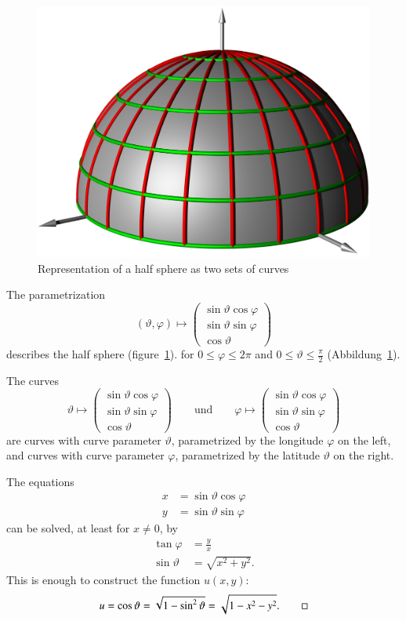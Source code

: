 \begin{beispiel}
\begin{figure}
\centering
\includegraphics[width=0.8\hsize]{../common/3d/kugel.jpg}
\caption{Representation of a half sphere as two sets of curves
\label{quasilinear:kugel}}
\end{figure}
The parametrization
\[
(\vartheta,\varphi)\mapsto
\begin{pmatrix}
\sin\vartheta\cos\varphi\\
\sin\vartheta\sin\varphi\\
\cos\vartheta
\end{pmatrix}
\]
describes the half sphere (figure~\ref{quasilinear:kugel}).
for $0\le\varphi\le 2\pi$ and $0\le \vartheta\le \frac{\pi}2$
(Abbildung~\ref{quasilinear:kugel}).

The curves
\[
\vartheta\mapsto
\begin{pmatrix}
\sin\vartheta\cos\varphi\\
\sin\vartheta\sin\varphi\\
\cos\vartheta
\end{pmatrix}
\qquad
\text{und}
\qquad
\varphi\mapsto
\begin{pmatrix}
\sin\vartheta\cos\varphi\\
\sin\vartheta\sin\varphi\\
\cos\vartheta
\end{pmatrix}
\]
are curves with curve parameter $\vartheta$, parametrized
by the longitude $\varphi$ on the left, and curves with curve parameter 
$\varphi$, parametrized by the latitude $\vartheta$ on the right.

The equations
\begin{align*}
x&=\sin\vartheta\cos\varphi\\
y&=\sin\vartheta\sin\varphi
\end{align*}
can be solved, at least for $x\ne 0$, by
\begin{align*}
\tan\varphi&=\frac{y}{x}\\
\sin\vartheta &=\sqrt{x^2+y^2}.
\end{align*}
This is enough to construct the function $u(x,y)$:
\[
u=\cos\vartheta=\sqrt{1-\sin^2\vartheta}=\sqrt{1-x^2-y^2}.
\qedhere
\]
\end{beispiel}

